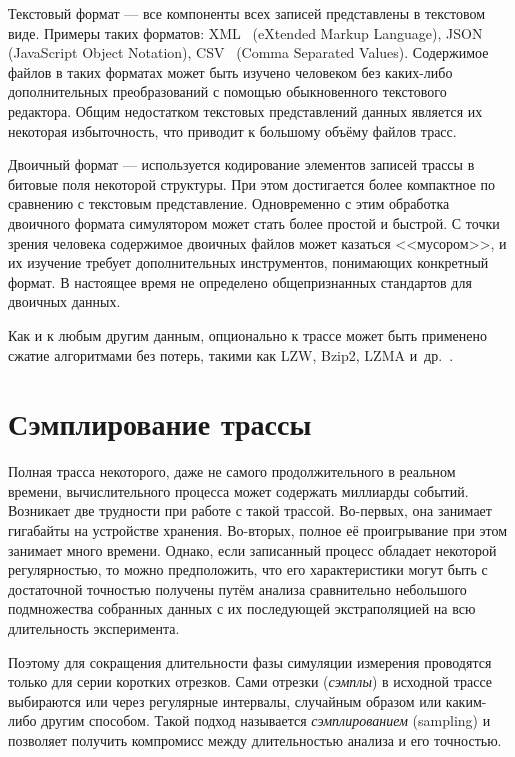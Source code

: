 \begin{description*}
    \item[Текстовый формат] --- все компоненты всех записей представлены в текстовом виде. Примеры таких форматов: XML~\cite{xml-std} (\abbr eXtended Markup Language), JSON~\cite{json-std} (\abbr  JavaScript Object Notation), CSV~\cite{csv-rfc} (\abbr Comma Separated Values). Содержимое файлов в таких форматах может быть изучено человеком без каких-либо дополнительных преобразований с помощью обыкновенного текстового редактора. Общим недостатком текстовых представлений данных является их некоторая избыточность, что приводит к большому объёму файлов трасс. 
    
    \item[Двоичный формат] --- используется кодирование элементов записей трассы в битовые поля некоторой структуры. При этом достигается более компактное по сравнению с текстовым представление. Одновременно с этим обработка двоичного формата симулятором может стать более простой и быстрой. С точки зрения человека содержимое двоичных файлов может казаться <<мусором>>, и их изучение требует дополнительных инструментов, понимающих конкретный формат. В настоящее время не определено общепризнанных стандартов для двоичных данных.
\end{description*}

Как и к любым другим данным, опционально к трассе может быть применено сжатие алгоритмами без потерь, такими как LZW, Bzip2, LZMA и~др.~\cite{sayood2002lossless}.

\section{Сэмплирование трассы}\label{sec:sampling}

Полная трасса некоторого, даже не самого продолжительного в реальном времени, вычислительного процесса может содержать миллиарды событий. Возникает две трудности при работе с такой трассой. Во-первых, она занимает гигабайты на устройстве хранения. Во-вторых, полное её проигрывание при этом занимает много времени. Однако, если записанный процесс обладает некоторой регулярностью, то можно предположить, что его характеристики могут быть с достаточной точностью получены путём анализа сравнительно небольшого подмножества собранных данных с их последующей экстраполяцией на всю длительность эксперимента.

Поэтому для сокращения длительности фазы симуляции измерения проводятся только для серии коротких отрезков. Сами отрезки (\textit{сэмплы}) в исходной трассе выбираются или через регулярные интервалы, случайным образом или каким-либо другим способом. Такой подход называется \textit{сэмплированием} (\abbr sampling) и позволяет получить компромисс между длительностью анализа и его точностью.

